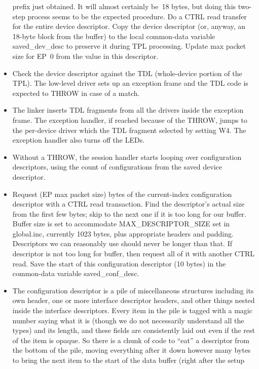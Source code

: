 \begin{itemize}
    prefix just obtained.  It will almost certainly be~18 bytes, but doing
    this two-step process seems to be the expected procedure.  Do a CTRL
    read transfer for the entire device descriptor.  Copy the device
    descriptor (or, anyway, an 18-byte block from the buffer) to the local
    common-data variable saved\_dev\_desc to preserve it during TPL
    processing.  Update max packet size for EP~0 from the value in this
    descriptor.
  \item Check the device descriptor against the TDL (whole-device portion of
    the TPL).  The low-level driver sets up an exception frame and the TDL
    code is expected to THROW in case of a match.
  \item The linker inserts TDL fragments from all the drivers inside the
    exception frame.  The exception handler, if reached because of the THROW,
    jumps to the per-device driver which the TDL fragment selected by setting
    W4.  The exception handler also turns off the LEDs.
  \item Without a THROW, the session handler starts looping over
    configuration descriptors, using the count of configurations from the
    saved device descriptor.
  \item Request (EP max packet size) bytes of the current-index configuration descriptor with a
    CTRL read transaction.  Find the descriptor's actual size from the first
    few bytes; skip to the next one if it is too long for our buffer. 
    Buffer size is set to accommodate MAX\_DESCRIPTOR\_SIZE set in
    global.inc, currently 1023 bytes, plus appropriate headers and padding. 
    Descriptors we can reasonably use should never be longer than that.
    If descriptor is not too long for buffer, then request all of it with
    another CTRL read.  Save the start of this configuration descriptor (10
    bytes) in the common-data variable saved\_conf\_desc.
  \item The configuration descriptor is a pile of miscellaneous structures
    including its own header, one or more interface descriptor headers, and other
    things nested inside the interface descriptors.  Every item in the pile
    is tagged with a magic number saying what it is (though we do not
    necessarily understand all the types) and its length, and these
    fields are consistently laid out even if the rest of the item is opaque. 
    So there is a chunk of code to ``eat'' a descriptor from the bottom of
    the pile, moving everything after it down however many bytes to bring
    the next item to the start of the data buffer (right after the setup

\end{itemize}
